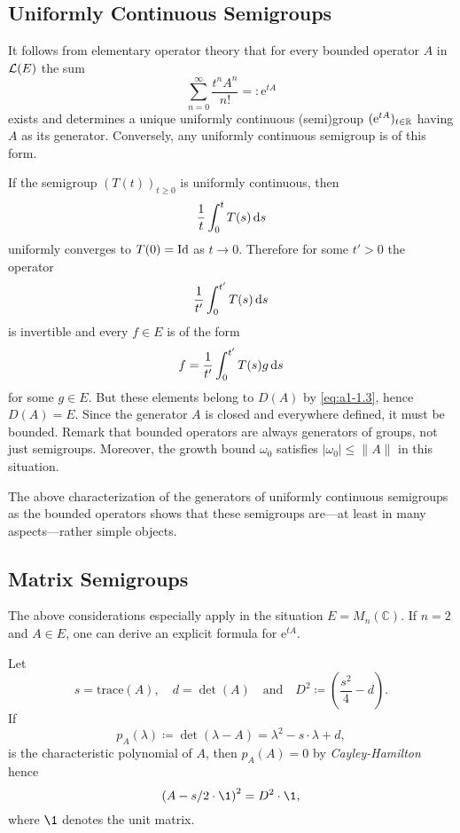 \subsection{Uniformly Continuous Semigroups}\label{subsec:a1-2.1}
It follows from elementary operator theory that for every bounded operator $A$ in  $\mathcal{L}(E)$ the sum
\[
    \sum_{n=0}^{\infty} \frac{t^{n}A^{n}}{n!} = \colon  \mathrm{e}^{tA}
\]
exists and determines a unique uniformly continuous (semi)group $( \mathrm{e}^{tA})_{t \in \mathbb{R}}$ having $A$ as its generator.
Conversely, any uniformly continuous semigroup is of this form.

If the semigroup $(T(t))_{t \geq 0}$ is uniformly continuous, then 
%
\[
	\frac{1}{t}\int_{0}^{t} T(s) \mathop{}\!\mathrm{d}{s}
\]
%
uniformly converges to $T(0) = \operatorname{Id}$ as $t \to 0$.
Therefore for some $t' > 0$ the operator 
%
\[
	\frac{1}{t'}\int_{0}^{t'} T(s) \mathop{}\!\mathrm{d}{s}
\]
%
is invertible and every $f \in E$ is of the form 
%
\[
	f = \frac{1}{t'}\int_{0}^{t'} T(s)g \mathop{}\!\mathrm{d}{s}
\]
%
for some $g \in E$.
But these elements belong to $D(A)$ by \eqref{eq:a1-1.3}, hence $D(A) = E$.
Since the generator $A$ is closed and everywhere defined, it must be bounded.
Remark that bounded operators are always generators of groups, not just semigroups.
Moreover, the growth bound $\omega_0$ satisfies $|\omega_0| \leq \|A\|$ in this situation.

The above characterization of the generators of uniformly continuous semigroups as the bounded operators shows that these semigroups are---at least in many aspects---rather simple objects.
\subsection{Matrix Semigroups}\label{subsec:a1-2.2}
The above considerations especially apply in the situation $E = M_{n}(\mathbb{C})$.
If $n = 2$ and $A \in E$, one can derive an explicit formula for $ \mathrm{e}^{tA}$. 

Let %
\[
	s = \text{trace}(A), 
	\quad 
	d = \det(A) 
	\quad \text{and} \quad
	D^{2} \coloneqq \left( \frac{s^{2}}{4} - d \right).
\]
%
If   
\[
p_A(\lambda) \coloneqq \det(\lambda - A) = \lambda^2-s\cdot \lambda + d , 
\]
is the characteristic polynomial  of $ A $, then $ p_{A}(A) = 0 $ by \emph{Cayley-Hamilton} hence
%
\[
	\left( A - s/2 \cdot \1 \right)^{2} = D^{2} \cdot \1 , 
\]
%
where $ \1 $ denotes the unit matrix.

